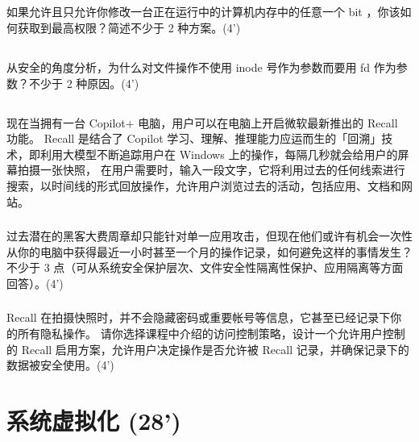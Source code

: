 \documentclass[a4paper,12pt]{article}
\newcommand{\score}[1]{(#1')}
\begin{document}
\subsection{}

如果允许且只允许你修改一台正在运行中的计算机内存中的任意一个 bit ，你该如何获取到最高权限？简述不少于 2 种方案。\score{4}

\subsection{}

从安全的角度分析，为什么对文件操作不使用 inode 号作为参数而要用 fd 作为参数？不少于 2 种原因。\score{4}

\subsection{}

现在当拥有一台 Copilot+ 电脑，用户可以在电脑上开启微软最新推出的 Recall 功能。
Recall 是结合了 Copilot 学习、理解、推理能力应运而生的「回溯」技术，即利用大模型不断追踪用户在 Windows 上的操作，每隔几秒就会给用户的屏幕拍摄一张快照，
在用户需要时，输入一段文字，它将利用过去的任何线索进行搜索，以时间线的形式回放操作，允许用户浏览过去的活动，包括应用、文档和网站。

\subsubsection{}

过去潜在的黑客大费周章却只能针对单一应用攻击，但现在他们或许有机会一次性从你的电脑中获得最近一小时甚至一个月的操作记录，如何避免这样的事情发生？
不少于 3 点（可从系统安全保护层次、文件安全性隔离性保护、应用隔离等方面回答）。\score{4}

\subsubsection{}

Recall 在拍摄快照时，并不会隐藏密码或重要帐号等信息，它甚至已经记录下你的所有隐私操作。
请你选择课程中介绍的访问控制策略，设计一个允许用户控制的 Recall 启用方案，允许用户决定操作是否允许被 Recall 记录，并确保记录下的数据被安全使用。\score{4}

\section{系统虚拟化 \score{28}}

\subsection{}
\end{document}
